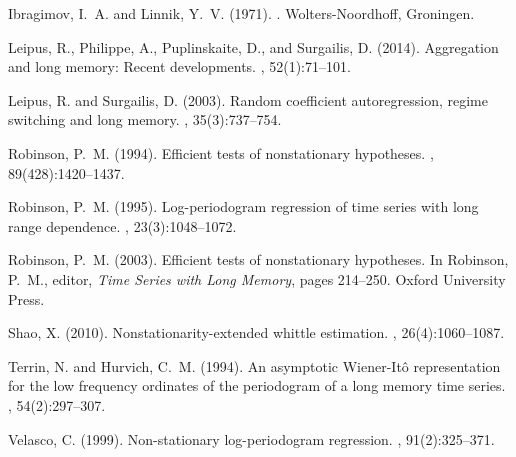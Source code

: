 \documentclass[12pt]{article}
\numberwithin{equation}{section}
\begin{document}
\begin{thebibliography}{}
Ibragimov, I.~A. and Linnik, Y.~V. (1971).
.
\newblock Wolters-Noordhoff, Groningen.

Leipus, R., Philippe, A., Puplinskaite, D., and Surgailis, D. (2014).
\newblock Aggregation and long memory: Recent developments.
, 52(1):71--101.

Leipus, R. and Surgailis, D. (2003).
\newblock Random coefficient autoregression, regime switching and long memory.
, 35(3):737--754.

Robinson, P.~M. (1994).
\newblock Efficient tests of nonstationary hypotheses.
,
  89(428):1420--1437.

Robinson, P.~M. (1995).
\newblock Log-periodogram regression of time series with long range dependence.
, 23(3):1048--1072.

Robinson, P.~M. (2003).
\newblock Efficient tests of nonstationary hypotheses.
\newblock In Robinson, P.~M., editor, {\em Time Series with Long Memory}, pages
  214--250. Oxford University Press.

Shao, X. (2010).
\newblock Nonstationarity-extended whittle estimation.
, 26(4):1060--1087.

Terrin, N. and Hurvich, C.~M. (1994).
\newblock An asymptotic {W}iener-{I}t\^{o} representation for the low frequency
  ordinates of the periodogram of a long memory time series.
, 54(2):297--307.

Velasco, C. (1999).
\newblock Non-stationary log-periodogram regression.
, 91(2):325--371.

\end{thebibliography}
\end{document}
